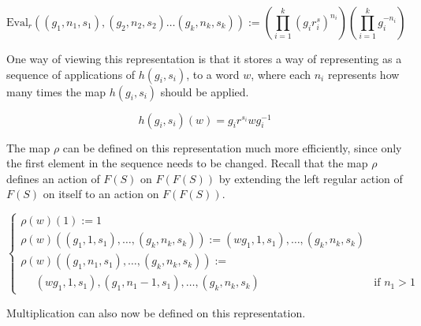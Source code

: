 \documentclass[12pt]{article} %
\theoremstyle{definition}
\theoremstyle{definition}
\theoremstyle{definition}
\theoremstyle{definition}
\begin{document}
\begin{equation}
  \text{Eval}_r((g_1, n_1, s_1), (g_2, n_2,s_2) \dots (g_k, n_k,s_k)) :=
  \left(\prod_{i=1}^k (g_ir^s_i)^{n_i}\right)\left(\prod_{i=1}^k g_i^{-n_i}\right)
\end{equation}

One way of viewing this representation is that it stores a way of representing
as a sequence of applications of $h(g_i,s_i)$, to a word $w$, where each $n_i$
represents how many times the map $h(g_i, s_i)$ should be applied.

\begin{equation}
  h(g_i, s_i)(w) = g_ir^{s_i}wg_i^{-1}
\end{equation}

The map $\rho$ can be defined on this representation much more efficiently,
since only the first
element in the sequence needs to be changed. Recall that the map
$\rho$ defines an action of $F(S)$ on $F(F(S))$ by extending the left regular
action of $F(S)$ on itself to an action on $F(F(S))$.

\begin{equation}
  \begin{cases}
    \rho(w)(1) := 1 \\
    \rho(w)((g_1, 1, s_1), \dots ,(g_k, n_k, s_k)) := (wg_1, 1, s_1), \dots, (g_k, n_k, s_k)\\
    \rho(w)((g_1, n_1, s_1),\dots ,(g_k, n_k, s_k)) := \\
     \ \ \ \ \ \ (wg_1, 1, s_1),(g_1, n_1 - 1, s_1),\dots,(g_k, n_k, s_k) & \text{if }n_1 > 1
  \end{cases}
\end{equation}

Multiplication can also now be defined on this representation.
\end{document}
